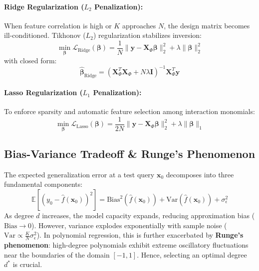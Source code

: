 \documentclass[10pt,twocolumn,a4paper]{article}
\begin{document}
\paragraph{Ridge Regularization ($L_2$ Penalization):}
When feature correlation is high or $K$ approaches $N$, the design matrix becomes ill-conditioned. Tikhonov ($L_2$) regularization stabilizes inversion:
\begin{equation}
\min_{\boldsymbol{\beta}} \mathcal{L}_{\text{Ridge}}(\boldsymbol{\beta}) = \frac{1}{N} \|\mathbf{y} - \mathbf{X}_\Phi \boldsymbol{\beta}\|_2^2 + \lambda \|\boldsymbol{\beta}\|_2^2
\end{equation}
with closed form:
\begin{equation}
\hat{\boldsymbol{\beta}}_{\text{Ridge}} = (\mathbf{X}_\Phi^T \mathbf{X}_\Phi + N\lambda \mathbf{I})^{-1} \mathbf{X}_\Phi^T \mathbf{y}
\end{equation}

\paragraph{Lasso Regularization ($L_1$ Penalization):}
To enforce sparsity and automatic feature selection among interaction monomials:
\begin{equation}
\min_{\boldsymbol{\beta}} \mathcal{L}_{\text{Lasso}}(\boldsymbol{\beta}) = \frac{1}{2N} \|\mathbf{y} - \mathbf{X}_\Phi \boldsymbol{\beta}\|_2^2 + \lambda \|\boldsymbol{\beta}\|_1
\end{equation}

\subsection{Bias-Variance Tradeoff \& Runge's Phenomenon}
The expected generalization error at a test query $\mathbf{x}_0$ decomposes into three fundamental components:
\begin{equation}
\mathbb{E}[(y_0 - \hat{f}(\mathbf{x}_0))^2] = \text{Bias}^2(\hat{f}(\mathbf{x}_0)) + \text{Var}(\hat{f}(\mathbf{x}_0)) + \sigma_\epsilon^2
\end{equation}
As degree $d$ increases, the model capacity expands, reducing approximation bias ($\text{Bias} \to 0$). However, variance explodes exponentially with sample noise ($\text{Var} \propto \frac{K}{N}\sigma_\epsilon^2$). In polynomial regression, this is further exacerbated by \textbf{Runge's phenomenon}: high-degree polynomials exhibit extreme oscillatory fluctuations near the boundaries of the domain $[-1, 1]$. Hence, selecting an optimal degree $d^*$ is crucial.
\end{document}

